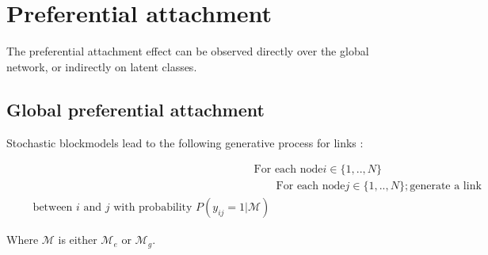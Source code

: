 
\section{Preferential attachment}

The preferential attachment effect can be observed directly over the global network, or indirectly on latent classes.

\subsection{Global preferential attachment}

Stochastic blockmodels lead to the following generative process for links  :

\begin{align*}
    &\textrm{For each node} i \in \{1, .., N\}  \\
    &\qquad\textrm{For each node} j \in \{1, .., N\}; \textrm{generate a link}  \\
    \qquad\textrm{between } i \textrm{ and } j \textrm{ with probability } P(y_{ij}=1 | \mathcal{M})
\end{align*}

Where $\mathcal{M}$ is either $\mathcal{M}_e$ or $\mathcal{M}_g$.

